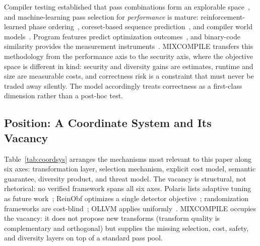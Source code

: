 \documentclass[5p,times,authoryear]{elsarticle}
\theoremstyle{plain}
\theoremstyle{definition}
\theoremstyle{remark}
\begin{document}
Compiler testing established that pass combinations form an explorable
space~\cite{bib16,bib17,bib18,bib19}, and machine-learning pass selection for
\emph{performance} is mature: reinforcement-learned phase ordering~\cite{bib20},
coreset-based sequence prediction~\cite{bib21}, and compiler world
models~\cite{bib22}. Program features predict optimization outcomes~\cite{bib25,bib26},
and binary-code similarity provides the measurement
instruments~\cite{bib23,bib24,bib27}. MIXCOMPILE transfers this methodology from the
performance axis to the security axis, where the objective space is different in kind:
security and diversity gains are estimates, runtime and size are measurable costs, and
correctness risk is a constraint that must never be traded away silently. The model
accordingly treats correctness as a first-class dimension rather than a post-hoc
test.

\subsection{Position: A Coordinate System and Its Vacancy}
\label{sec:coordsys}

Table~\ref{tab:coordsys} arranges the mechanisms most relevant to this paper along six
axes: transformation layer, selection mechanism, explicit cost model, semantic
guarantee, diversity product, and threat model. The vacancy is structural, not
rhetorical: no verified framework spans all six axes. Polaris lists adaptive tuning
as future work~\cite{zhou2026polaris}; ReinObf optimizes a single detector
objective~\cite{wei2025reinobf}; randomization frameworks are
cost-blind~\cite{bib2,franzen2023randcompile}; OLLVM applies uniformly~\cite{bib8}.
MIXCOMPILE occupies the vacancy: it does not propose new transforms (transform quality
is complementary and orthogonal) but supplies the missing selection, cost, safety, and
diversity layers on top of a standard pass pool.
\end{document}
